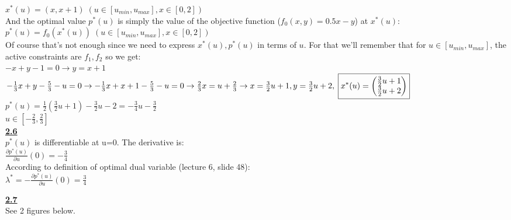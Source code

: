 \documentclass[fleqn]{article}
\begin{document}
$x^*(u) = (x,x+1) \; (u \in [u_{min}, u_{max}], x \in [0,2])$\\

And the optimal value $p^*(u)$ is simply the value of the objective function ($f_0(x,y) = 0.5x-y$) at $x^*(u)$: \\

$p^*(u) = f_0(x^*(u)) \; (u \in [u_{min}, u_{max}], x \in [0,2])$\\

Of course that's not enough since we need to express $x^*(u), p^*(u)$ in terms of $u$. For that we'll remember that for $u \in [u_{min}, u_{max}]$, the active constraints are $f_1, f_2$ so we get:\\

$-x + y - 1 = 0 \rightarrow y=x+1$\\
$-\frac{1}{3}x + y - \frac{5}{3} - u = 0 \rightarrow
-\frac{1}{3}x + x + 1 - \frac{5}{3} - u = 0 \rightarrow
\frac{2}{3}x = u+\frac{2}{3} \rightarrow \\
x = \frac{3}{2}u+1, y = \frac{3}{2}u+2, \; 
\boxed{x^*(u) = \begin{pmatrix}
           \frac{3}{2}u+1 \\
           \frac{3}{2}u+2 
         \end{pmatrix}}$\\
        

$\boxed{p^*(u) = \frac{1}{2} \left( \frac{3}{2}u+1 \right) - \frac{3}{2}u-2 = 
-\frac{3}{4}u-\frac{3}{2}}$\\

$u \in [-\frac{2}{3}, \frac{2}{3}]$ \\


\underline{\textbf{2.6}} \\
$p^*(u)$ is differentiable at u=0. The derivative is:\\
$\frac{\partial p^*(u)}{\partial u} (0) = -\frac{3}{4}$\\
According to definition of optimal dual variable (lecture 6, slide 48): \\
$\lambda ^* = -\frac{\partial p^*(u)}{\partial u}(0) = \frac{3}{4}$


\underline{\textbf{2.7}} \\
See 2 figures below. \\
\end{document}
